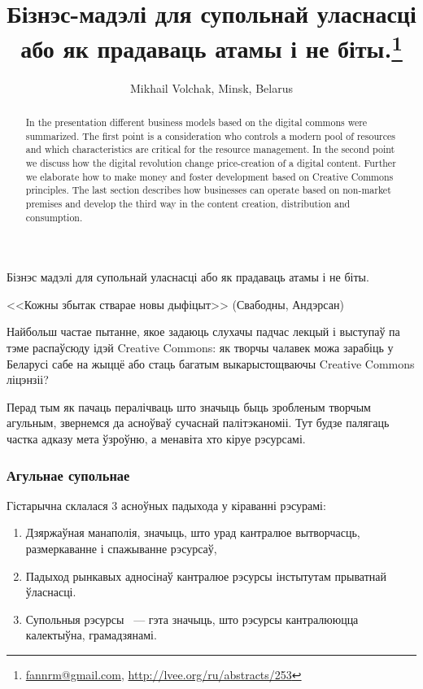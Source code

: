 \documentclass[10pt, a5paper]{article}
\begin{document}
\title{Бізнэс-мадэлі для супольнай уласнасці або як прадаваць атамы і не біты.\footnote{\url{fannrm@gmail.com}, \url{http://lvee.org/ru/abstracts/253}}}
\author{Mikhail Volchak, Minsk, Belarus}
\maketitle
\begin{abstract}
In the presentation different business models based on the digital commons were summarized. The first point is a consideration who controls a modern pool of resources and which characteristics are critical for the resource management. In the second point we discuss how the digital revolution change price-creation of a digital content. Further we elaborate how to make money and foster development based on Creative Commons principles. The last section describes how businesses can operate based on non-market premises and develop the third way in the content creation, distribution and consumption.
\end{abstract}
Бізнэс мадэлі для супольнай уласнасці або як прадаваць атамы і не біты.

<<Кожны збытак стварае новы дыфіцыт>> 
(Свабодны, Андэрсан)

Найбольш частае пытанне, якое задаюць слухачы падчас лекцый і выступаў па тэме распаўсюду ідэй Creative Commons: як творчы чалавек можа зарабіць у Беларусі сабе на жыццё або стаць багатым выкарыстощваючы Creative Commons ліцэнзіі?

Перад тым як пачаць пералічваць што значыць быць зробленым творчым агульным, звернемся да асноўваў сучаснай палітэканоміі. Тут будзе палягаць частка адказу мета ўзроўню, а менавіта хто кіруе рэсурсамі.

\subsubsection*{Агульнае супольнае}

Гістарычна склалася 3 асноўных падыхода у кіраванні рэсурамі:

\begin{enumerate}
  \item Дзяржаўная манаполія, значыць, што урад кантралюе вытворчасць, размеркаванне і спажыванне рэсурсаў,
  \item Падыход рынкавых адносінаў кантралюе рэсурсы інстытутам прыватнай ўласнасці.
  \item Супольныя рэсурсы ~--- гэта значыць, што рэсурсы кантралююцца калектыўна, грамадзянамі.
\end{enumerate}
\end{document}
